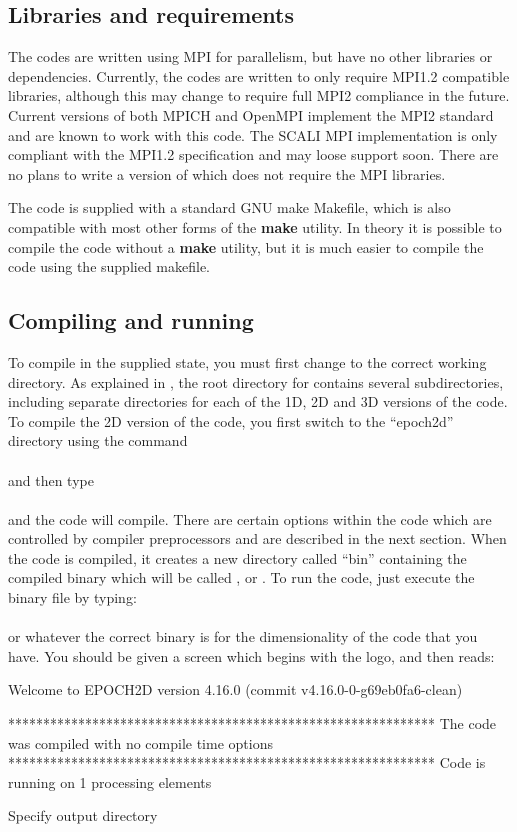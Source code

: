 \subsection{Libraries and requirements}
The {\EPOCH} codes are written using MPI for parallelism, but have no other
libraries or dependencies. Currently, the codes are written to only require
MPI1.2 compatible libraries, although this may change to require full MPI2
compliance in the future. Current versions of both MPICH and OpenMPI implement
the MPI2 standard and are known to work with this code. The SCALI MPI
implementation is only compliant with the MPI1.2 specification and may loose
support soon.
There are no plans to write a version of {\EPOCH} which does not require
the MPI libraries.

The code is supplied with a standard GNU make Makefile, which is also
compatible with most other forms of the {\bf make} utility. In theory it is
possible to compile the code without a {\bf make} utility, but it is much
easier to compile the code using the supplied makefile.

\subsection{\texorpdfstring
  {Compiling and running {\EPOCH}}
  {Compiling and running {EPOCH}}}

To compile {\EPOCH} in the supplied state, you must first change to the
correct working directory. As explained in , the
root directory for {\EPOCH} contains several subdirectories, including
separate directories for each of the 1D, 2D and 3D versions of the code.
To compile the 2D version of the code, you first switch to the ``epoch2d''
directory using the command\\
\indent{}\\
and then type\\
\indent{}\\
and the code will compile. There are certain options within the code which are
controlled by compiler preprocessors and are described in the next
section. When the code is compiled, it creates a new directory called ``bin''
containing the compiled binary which will be called ,
 or . To run the code, just execute the
binary file by typing:\\
\indent{}\\
or whatever the correct binary is for the dimensionality of the code that you
have. You should be given a screen which begins with the {\EPOCH} logo, and then
reads:
\begin{boxverbatim}
 Welcome to EPOCH2D version 4.16.0   (commit v4.16.0-0-g69eb0fa6-clean)

 *************************************************************
 The code was compiled with no compile time options
 *************************************************************
 Code is running on 1 processing elements

 Specify output directory
\end{boxverbatim}

